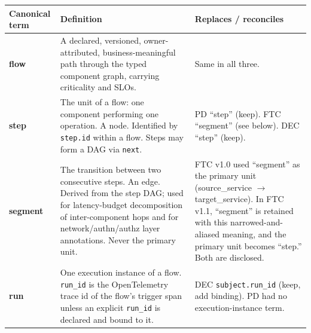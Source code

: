 \documentclass[11pt]{article}
\newcommand{\code}[1]{\texttt{#1}}
\begin{document}
\begin{center}
\footnotesize
\begin{tabular}{@{}p{2.7cm} p{7.1cm} p{5.6cm}@{}}
\toprule
\textbf{Canonical term} & \textbf{Definition} & \textbf{Replaces / reconciles} \\
\midrule
\textbf{flow} & A declared, versioned, owner-attributed, business-meaningful path through the typed component graph, carrying criticality and SLOs. & Same in all three. \\
\addlinespace
\textbf{step} & The unit of a flow: one component performing one operation. A node. Identified by \code{step.id} within a flow. Steps may form a DAG via \code{next}. & PD ``step'' (keep). FTC ``segment'' (see below). DEC ``step'' (keep). \\
\addlinespace
\textbf{segment} & The transition between two consecutive steps. An edge. Derived from the step DAG; used for latency-budget decomposition of inter-component hops and for network/authn/authz layer annotations. Never the primary unit. & FTC v1.0 used ``segment'' as the primary unit (source\_service \(\rightarrow\) target\_service). In FTC v1.1, ``segment'' is retained with this narrowed-and-aliased meaning, and the primary unit becomes ``step.'' Both are disclosed. \\
\addlinespace
\textbf{run} & One execution instance of a flow. \code{run\_id} is the OpenTelemetry trace id of the flow's trigger span unless an explicit \code{run\_id} is declared and bound to it. & DEC \code{subject.run\_id} (keep, add binding). PD had no execution-instance term. \\
\bottomrule
\end{tabular}
\end{center}
\end{document}
